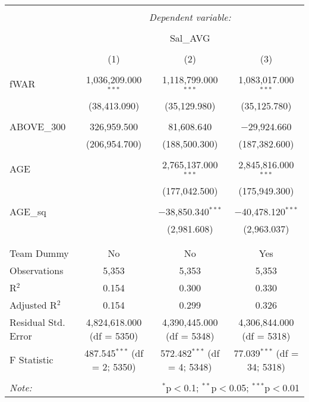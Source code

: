 
\begin{table}[!htbp] \centering
  \caption{}
  \label{}
\begin{tabular}{@{\extracolsep{5pt}}lccc}
\\[-1.8ex]\hline
\hline \\[-1.8ex]
 & \multicolumn{3}{c}{\textit{Dependent variable:}} \\
\cline{2-4}
\\[-1.8ex] & \multicolumn{3}{c}{Sal\_AVG} \\
\\[-1.8ex] & (1) & (2) & (3)\\
\hline \\[-1.8ex]
 fWAR & 1,036,209.000$^{***}$ & 1,118,799.000$^{***}$ & 1,083,017.000$^{***}$ \\
  & (38,413.090) & (35,129.980) & (35,125.780) \\
  & & & \\
 ABOVE\_300 & 326,959.500 & 81,608.640 & $-$29,924.660 \\
  & (206,954.700) & (188,500.300) & (187,382.600) \\
  & & & \\
 AGE &  & 2,765,137.000$^{***}$ & 2,845,816.000$^{***}$ \\
  &  & (177,042.500) & (175,949.300) \\
  & & & \\
 AGE\_sq &  & $-$38,850.340$^{***}$ & $-$40,478.120$^{***}$ \\
  &  & (2,981.608) & (2,963.037) \\
  & & & \\
\hline \\[-1.8ex]
Team Dummy & No & No & Yes \\
Observations & 5,353 & 5,353 & 5,353 \\
R$^{2}$ & 0.154 & 0.300 & 0.330 \\
Adjusted R$^{2}$ & 0.154 & 0.299 & 0.326 \\
Residual Std. Error & 4,824,618.000 (df = 5350) & 4,390,445.000 (df = 5348) & 4,306,844.000 (df = 5318) \\
F Statistic & 487.545$^{***}$ (df = 2; 5350) & 572.482$^{***}$ (df = 4; 5348) & 77.039$^{***}$ (df = 34; 5318) \\
\hline
\hline \\[-1.8ex]
\textit{Note:}  & \multicolumn{3}{r}{$^{*}$p$<$0.1; $^{**}$p$<$0.05; $^{***}$p$<$0.01} \\
\end{tabular}
\end{table}
